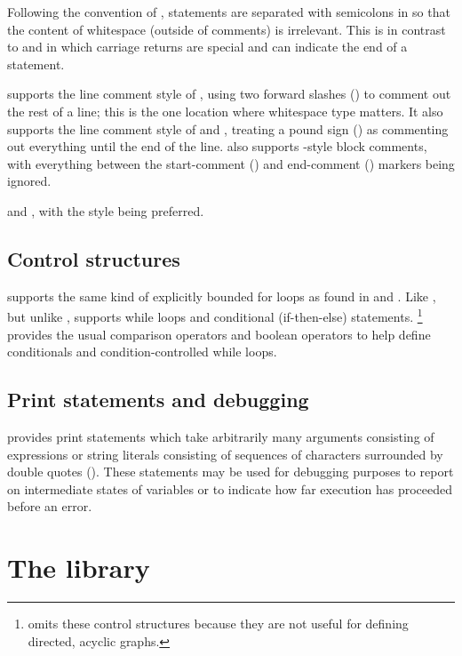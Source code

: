 \documentclass[article]{jss}
\begin{document}
Following the convention of , statements are separated
with semicolons in  so that the content of whitespace
(outside of comments) is irrelevant.  This is in contrast to
 and  in which carriage returns are
special and can indicate the end of a statement.

 supports the line comment style of ,
using two forward slashes (\code{//}) to comment out the rest of a
line; this is the one location where whitespace type matters.  It also
supports the line comment style of  and ,
treating a pound sign (\code{\#}) as commenting out everything until
the end of the line.   also supports
-style block comments, with everything between the
start-comment (\code{/*}) and end-comment (\code{*/}) markers being
ignored.


and , with the  style being preferred.  

\subsection{Control structures}

 supports the same kind of explicitly bounded for loops
as found in  and .  Like , but unlike
,  supports while loops and conditional
(if-then-else) statements.%
%
\footnote{ omits these control structures because they
  are not useful for defining directed, acyclic graphs.}
%
 provides the usual comparison operators and boolean
operators to help define conditionals and condition-controlled while
loops.  

\subsection{Print statements and debugging}

 provides print statements which take arbitrarily many
arguments consisting of expressions or string literals consisting of
sequences of characters surrounded by double quotes ().
These statements may be used for debugging purposes to report on
intermediate states of variables or to indicate how far execution has
proceeded before an error.

\section[The Stan library]{The  library}







%

\end{document}
